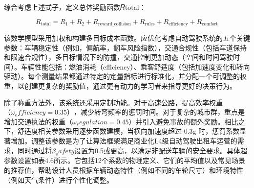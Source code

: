 综合考虑上述式子，定义总体奖励函数𝑅total：

\begin{equation}
	R_{\text{total}} = R_1 + R_2 + R_{\text{reward\_collision}} + R_{\text{rules}} + R_{\text{efficiency}} + R_{\text{comfort}}
\end{equation}

该数学模型采用加权和构建多目标成本函数。应优化考虑自动驾驶系统的五个关键参数：车辆稳定性（例如，偏航率，翻车风险指数），交通合规性（包括车道保持和限速合规性），多目标情况下的防撞，交通控制更加动态（空间和时间驾驶时间）。车辆性能包括：燃油消耗（efficiency）、乘客舒适度（包括加速度变化和转向驱动）。每个测量结果都通过特定的定量指标进行标准化，并分配一个可调整的权重，以创建更复杂的奖励值，通过更有动力的学习者来指导更好的决策行为。

除了称重方法外，该系统还采用定制功能。对于高速公路，提高效率权重\(（ω_efficiency=0.35）\)，减少转弯频率的惩罚时间。对于复杂的城市群，重点是增加交通执法的权重\(（ω_regulation=0.45）\)并引入避免事故的额外奖励。相比之下，舒适度相关参数采用逐步函数建模，当横向加速度超过 0.3g 时，惩罚系数显著增加。调整该参数是为了让算法框架满足商业化L4级自动驾驶出租车运营的需求，同时通过将\(β_safety\)设置为0.5或更高，以满足非配送车辆的安全要求。具体超参数设置如表4.6所示。它包括12个系数的物理定义、它们的平均值以及常见场景的推荐值，帮助设计人员根据车辆动态特性（例如不同的车轮尺寸）和环境特性（例如天气条件）进行个性化调整。

